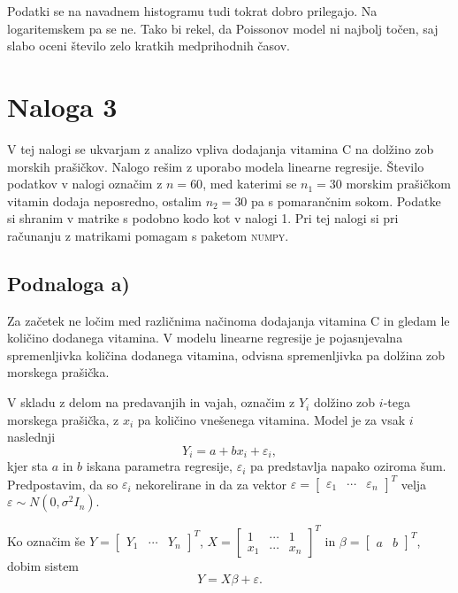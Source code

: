 \documentclass[12pt, a4paper]{article}
\begin{document}
Podatki se na navadnem histogramu tudi tokrat dobro prilegajo. Na logaritemskem pa se ne. Tako bi rekel, da Poissonov model ni najbolj točen, saj slabo oceni število zelo kratkih medprihodnih časov.


\section*{Naloga 3}
V tej nalogi se ukvarjam z analizo vpliva dodajanja vitamina C na dolžino zob morskih prašičkov. Nalogo rešim z uporabo modela linearne regresije. Število podatkov v nalogi označim z $n=60$, med katerimi se $n_1=30$ morskim prašičkom vitamin dodaja neposredno, ostalim $n_2 = 30$ pa s pomarančnim sokom. Podatke si shranim v matrike s podobno kodo kot v nalogi 1. Pri tej nalogi si pri računanju z matrikami pomagam s paketom \textsc{numpy}.

\subsection*{Podnaloga a)}
Za začetek ne ločim med različnima načinoma dodajanja vitamina C in gledam le količino dodanega vitamina. V modelu linearne regresije je pojasnjevalna spremenljivka količina dodanega vitamina, odvisna spremenljivka pa dolžina zob morskega prašička.

V skladu z delom na predavanjih in vajah, označim z $Y_i$ dolžino zob $i$-tega morskega prašička, z $x_i$ pa količino vnešenega vitamina. Model je za vsak $i$ naslednji
\[
Y_i = a + bx_i + \varepsilon_i,
\]
kjer sta $a$ in $b$ iskana parametra regresije, $\varepsilon_i$ pa predstavlja napako oziroma šum. Predpostavim, da so $\varepsilon_i$ nekorelirane in da za vektor 
$\varepsilon =  \begin{bmatrix} \varepsilon_1 & \cdots & \varepsilon_n \end{bmatrix}^T$ velja $\varepsilon \sim N(0, \sigma^2 I_n)$.

Ko označim še $Y = \begin{bmatrix} Y_1 & \cdots & Y_n \end{bmatrix}^T$, 
$X = 
\begin{bmatrix}
1 & \cdots & 1 \\
x_1 & \cdots & x_n 
\end{bmatrix}^T$ in 
$\beta = \begin{bmatrix} a & b \end{bmatrix}^T$, dobim sistem
\[
Y = X \beta + \varepsilon.
\]
\end{document}
